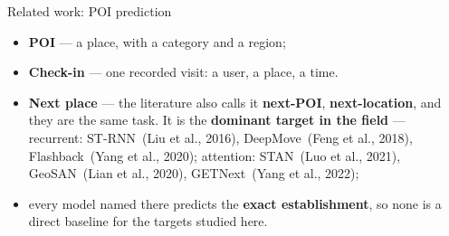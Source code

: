 \documentclass{beamer}
\begin{document}
\begin{frame}{Related work: POI prediction}
    \vspace{0pt}%

    \begin{itemize}\setlength{\itemsep}{2ex}
        \item \textbf{POI} --- a place, with a category and a region;
        \item \textbf{Check-in} --- one recorded visit: a user, a place, a time.
        \item \textbf{Next place} --- the literature also calls it \textbf{next-POI},
              \textbf{next-location}, and they are the same task. It is the
              \textbf{dominant target in the field} --- recurrent: ST-RNN~{\scriptsize(Liu et al., 2016)}, DeepMove~{\scriptsize(Feng et al., 2018)},
              Flashback~{\scriptsize(Yang et al., 2020)}; attention: STAN~{\scriptsize(Luo et al., 2021)}, GeoSAN~{\scriptsize(Lian et al., 2020)}, GETNext~{\scriptsize(Yang et al., 2022)};
        \item every model named there predicts the \textbf{exact establishment}, so
              \alert{none is a direct baseline} for the targets studied here.
    \end{itemize}
\end{frame}
\end{document}
